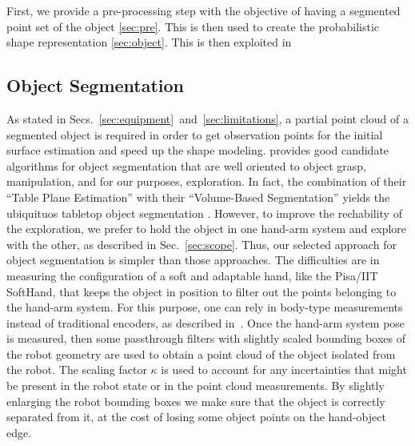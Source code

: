 First, we provide a pre-processing step with the objective of having a segmented
point  set  of  the object  \ref{sec:pre}.  This  is  then  used to  create  the
probabilistic shape representation \ref{sec:object}. This is then exploited in

\subsection{Object Segmentation}
\label{sec:segmentation}

As stated in Secs.~\ref{sec:equipment}~and~\ref{sec:limitations}, a partial point cloud
of a segmented object is required in order to get observation points for the initial
surface estimation and speed up the shape modeling.
\citet[Sec.~III.A]{Hudson2012Endtoend}  provides  good   candidate algorithms  for  object
segmentation  that are  well oriented  to  object grasp,  manipulation, and  for
our  purposes, exploration.  In fact,  the  combination of  their ``Table  Plane
Estimation''  with their  ``Volume-Based  Segmentation''  yields the  ubiquituos
tabletop object segmentation \citep{TabletopObjectDetector}. However, to improve
the  rechability  of the  exploration,  we  prefer to  hold  the  object in  one
hand-arm system and explore with the other, as described in Sec.~\ref{sec:scope}.
Thus,  our selected  approach  for  object segmentation  is  simpler than  those
approaches.  The  difficulties are  in  measuring  the  configuration of  a  soft
and  adaptable  hand, like the Pisa/IIT SoftHand,
that  keeps  the  object  in  position  to  filter  out
the  points  belonging  to  the  hand-arm system.  For  this  purpose,  one  can
rely in  body-type measurements  instead of  traditional encoders,  as described
in~\citet{Santaera2015Lowcost}.
Once the hand-arm  system pose is measured, then
some   passthrough filters with slightly  scaled bounding boxes of  the robot
geometry  are used  to obtain  a  point cloud  of  the object  isolated from  the
robot. The scaling factor $\kappa$ is used to account for any incertainties that might
be present in the robot state or in the point cloud measurements. 
By slightly enlarging the robot bounding boxes we make sure that the object is correctly
separated from it, at the cost of losing some object points on the hand-object edge.

